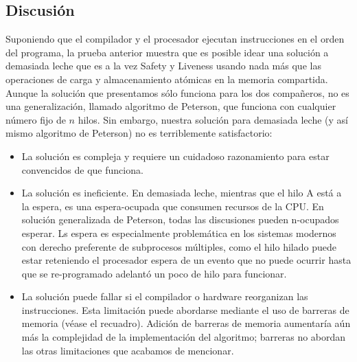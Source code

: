 \documentclass[10pt]{book}
\begin{document}
\subsection{Discusión}
Suponiendo que el compilador y el procesador ejecutan instrucciones en el orden del programa, la prueba anterior muestra que es posible idear una solución a demasiada leche que es a la vez Safety y Liveness usando nada más que las operaciones de carga y almacenamiento atómicas en la memoria compartida. Aunque la solución que presentamos sólo funciona para los dos compañeros, no es una generalización, llamado algoritmo de Peterson, que funciona con cualquier número fijo de $n$ hilos. Sin embargo, nuestra solución para demasiada leche (y así mismo algoritmo de Peterson) no es terriblemente satisfactorio:
\begin{itemize}
\item La solución es compleja y requiere un cuidadoso razonamiento para estar convencidos de que funciona.
\item La solución es ineficiente. En demasiada leche, mientras que el hilo A está a la espera, es una espera-ocupada que consumen recursos de la CPU. En solución generalizada de Peterson, todas las discusiones pueden n-ocupados esperar. Ls espera es especialmente problemática en los sistemas modernos con derecho preferente de subprocesos múltiples, como el hilo hilado puede estar reteniendo el procesador espera de un evento que no puede ocurrir hasta que se re-programado adelantó un poco de hilo para funcionar.
\item La solución puede fallar si el compilador o hardware reorganizan las instrucciones. Esta limitación puede abordarse mediante el uso de barreras de memoria (véase el recuadro). Adición de barreras de memoria aumentaría aún más la complejidad de la implementación del algoritmo; barreras no abordan las otras limitaciones que acabamos de mencionar.
\end{itemize}
\end{document}
